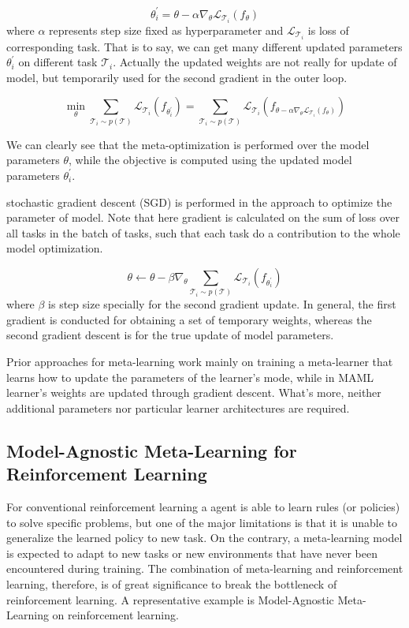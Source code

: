 $$\theta_{i}^{\prime}=\theta-\alpha \nabla_{\theta} \mathcal{L}_{\mathcal{T}_{i}}\left(f_{\theta}\right)$$
where $\alpha$ represents step size fixed as hyperparameter and $\mathcal{L}_{\mathcal{T}_{i}}$ is loss of corresponding task.
That is to say, we can get many different updated parameters $\theta_{i}^{\prime}$ on different task $\mathcal{T}_{i}$. Actually the updated weights are not really for update of model, but temporarily used for the second gradient in the outer loop. 

$$
\min _{\theta} \sum_{\mathcal{T}_{i} \sim p(\mathcal{T})} \mathcal{L}_{\mathcal{T}_{i}}\left(f_{\theta_{i}^{\prime}}\right)=\sum_{\mathcal{T}_{i} \sim p(\mathcal{T})} \mathcal{L}_{\mathcal{T}_{i}}\left(f_{\theta-\alpha \nabla_{\theta} \mathcal{L}_{\mathcal{T}_{i}}\left(f_{\theta}\right)}\right)
$$

We can clearly see that the meta-optimization is performed over the
model parameters $\theta$, while the objective is computed using the updated model parameters $\theta_{i}^{\prime}$.

stochastic gradient descent (SGD) is performed in the approach to optimize the parameter of model. Note that here gradient is calculated on the sum of loss over all tasks in the batch of tasks, such that each task do a contribution to the whole model optimization.

$$
\theta \leftarrow \theta-\beta \nabla_{\theta} \sum_{\mathcal{T}_{i} \sim p(\mathcal{T})} \mathcal{L}_{\mathcal{T}_{i}}\left(f_{\theta_{i}^{\prime}}\right)
$$
where $\beta$ is step size specially for the second gradient update.
In general, the first gradient is conducted for obtaining a set of temporary weights, whereas the second gradient descent is for the true update of model parameters. 

Prior approaches for meta-learning work mainly on training a meta-learner that learns how to update the parameters of the learner’s mode, while in MAML learner’s weights are updated through gradient descent. What's more, neither additional parameters nor particular learner architectures are required.

\subsection{Model-Agnostic Meta-Learning for Reinforcement Learning}
For conventional reinforcement learning a agent is able to learn rules (or policies) to solve specific problems, but one of the major limitations is that it is unable to generalize the learned policy to new task. On the contrary, a meta-learning model is expected to adapt to new tasks or new environments that have never been encountered during training. The combination of meta-learning and reinforcement learning, therefore, is of great significance to break the bottleneck of reinforcement learning. A representative example is Model-Agnostic Meta-Learning on reinforcement learning.

